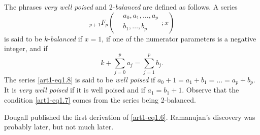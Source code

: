 The phrases \textit{very well poised} and 2-\textit{balanced} are defined as follows. A series
\begin{equation}
{}_{p+1} F_p \left(
\begin{aligned}
&a_0, a_1, \ldots, a_p\\
& b_1, \ldots, b_p
\end{aligned} ;x
\right)
\label{art1-eq1.8}
\end{equation}
is said to be $k$-\textit{balanced} if $x =1$, if one of the numerator parameters is a negative integer, and if 
$$
k + \sum\limits^{p}_{j=0} a_j = \sum\limits^{p}_{j=1} b_j.
$$
The series \ref{art1-eq1.8} is said to be \textit{well poised} if $a_0 +1 = a_1 + b_1 = \ldots = a_{p} + b_p$. It is \textit{very well poised} if it is well poised and if $a_1 = b_1 + 1$. Observe that the condition \eqref{art1-eq1.7} comes from the series being 2-balanced.

Dougall \cite{art1-key7} published the first derivation of \eqref{art1-eq1.6}. Ramanujan's discovery was probably later, but not much later. 

